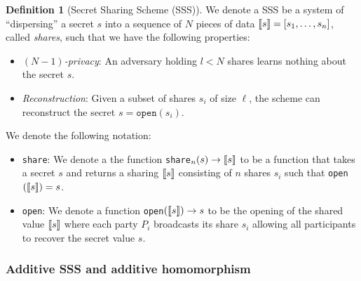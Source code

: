 \documentclass[11pt]{report}
\theoremstyle{definition}
\newtheorem{definition}{Definition}[section]
\theoremstyle{plain}
\begin{document}
\begin{definition}[Secret Sharing Scheme (SSS)]\label{def:ss-share}
  We denote a SSS be a system of ``dispersing'' a secret $s$ into a sequence of $N$ pieces of data $\llbracket s \rrbracket = [s_1, \dots, s_n]$, called \emph{shares}, such that we have the following properties:
  \begin{itemize}[parsep=0pt, itemsep=0pt]
    \item \textit{$(N-1)$-privacy}: An adversary holding $l < N$ shares learns nothing about the secret $s$.
    \item \textit{Reconstruction}: Given a subset of shares $s_i$ of size $\ell$, the scheme can reconstruct the secret $s = \texttt{open}(s_i)$.
  \end{itemize}
  We denote the following notation:
  \begin{itemize}
    \item \texttt{share}: We denote a the function \texttt{share}$_n(s) \rightarrow \llbracket s \rrbracket$ to be a function that takes a secret $s$ and returns a sharing $\llbracket s \rrbracket$ consisting of $n$ shares $s_i$ such that \texttt{open}$(\llbracket s \rrbracket) = s$.
    \item \texttt{open}: We denote a function \texttt{open}$(\llbracket s \rrbracket) \rightarrow s$ to be the opening of the shared value $\llbracket s \rrbracket$ where each party $P_i$ broadcasts its share $s_i$ allowing all participants to recover the secret value $s$.
  \end{itemize}
\end{definition}

\subsubsection{Additive SSS and additive homomorphism}\label{sec:additive-sss}
\end{document}
